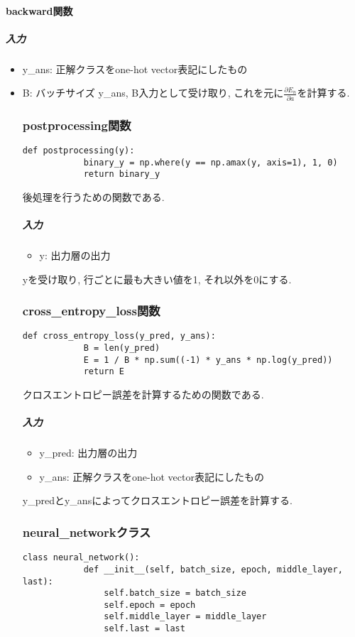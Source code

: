\documentclass[a4j, titlepage]{jarticle}
\begin{document}
        \paragraph*{backward関数}
            \subparagraph*{入力}
            \begin{itemize}
                \item y\_ans: 正解クラスをone-hot vector表記にしたもの
                \item B: バッチサイズ
            y\_ans, B入力として受け取り, これを元に\(\displaystyle \frac{\partial E_n}{\partial a}\)を計算する.

    \subsubsection{postprocessing関数}
        \begin{lstlisting}[caption=後処理,label=fuga]
        def postprocessing(y):
            binary_y = np.where(y == np.amax(y, axis=1), 1, 0)
            return binary_y
        \end{lstlisting}
        後処理を行うための関数である.
            \subparagraph*{入力}
            \begin{itemize}
                \item y: 出力層の出力
            \end{itemize}
            yを受け取り, 行ごとに最も大きい値を1, それ以外を0にする.

    \subsubsection{cross\_entropy\_loss関数}
        \begin{lstlisting}[caption=クロスエントロピー誤差の計算,label=fuga]
        def cross_entropy_loss(y_pred, y_ans):
            B = len(y_pred)
            E = 1 / B * np.sum((-1) * y_ans * np.log(y_pred))
            return E
        \end{lstlisting}
        クロスエントロピー誤差を計算するための関数である.
            \subparagraph*{入力}
            \begin{itemize}
                \item y\_pred: 出力層の出力
                \item y\_ans: 正解クラスをone-hot vector表記にしたもの
            \end{itemize}
            y\_predとy\_ansによってクロスエントロピー誤差を計算する.

    \subsubsection{neural\_networkクラス}
        \begin{lstlisting}[caption=3層ニューラルネットワークの構成 ,label=fuga]
        class neural_network():
            def __init__(self, batch_size, epoch, middle_layer, last):
                self.batch_size = batch_size
                self.epoch = epoch
                self.middle_layer = middle_layer
                self.last = last


\end{lstlisting}
\end{itemize}
\end{document}
